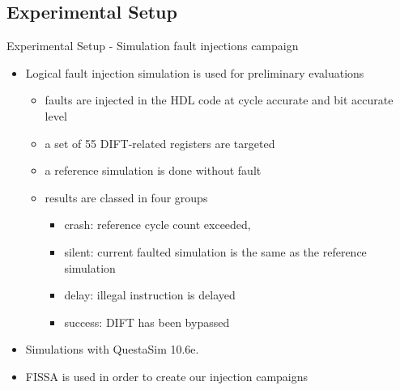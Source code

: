 \subsection{Experimental Setup}
\begin{frame}{Experimental Setup - Simulation fault injections campaign}
    \begin{itemize}
        \justifying
        \item Logical fault injection simulation is used for preliminary evaluations
              \begin{itemize}
                  \justifying
                  \item faults are injected in the HDL code at cycle accurate and bit accurate level
                  \item a set of 55 DIFT-related registers are targeted
                  \item a reference simulation is done without fault
                  \item results are classed in four groups
                        \begin{itemize}
                            \justifying
                            \item crash: reference cycle count exceeded,
                            \item silent: current faulted simulation is the same as the reference simulation
                            \item delay: illegal instruction is delayed
                            \item success: DIFT has been bypassed
                        \end{itemize}
              \end{itemize}
        \item Simulations with QuestaSim 10.6e.
        \item FISSA is used in order to create our injection campaigns
    \end{itemize}
\end{frame}
